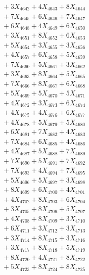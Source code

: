 \documentclass[a4paper,10pt]{article}
\begin{document}
{\begin{align}
&\;  + 3 X_{4642} + 4 X_{4643} + 8 X_{4644} \\[0.3ex]
&\;  + 7 X_{4645} + 6 X_{4646} + 7 X_{4647} \\[0.3ex]
&\;  + 6 X_{4648} + 4 X_{4649} + 6 X_{4650} \\[0.3ex]
&\;  + 3 X_{4651} + 8 X_{4652} + 6 X_{4653} \\[0.3ex]
&\;  + 5 X_{4654} + 3 X_{4655} + 3 X_{4656} \\[0.3ex]
&\;  + 4 X_{4657} + 6 X_{4658} + 5 X_{4659} \\[0.5ex]\allowbreak
&\;  + 7 X_{4660} + 5 X_{4661} + 3 X_{4662} \\[0.3ex]
&\;  + 3 X_{4663} + 8 X_{4664} + 5 X_{4665} \\[0.3ex]
&\;  + 7 X_{4666} + 8 X_{4667} + 6 X_{4668} \\[0.3ex]
&\;  + 5 X_{4669} + 5 X_{4670} + 5 X_{4671} \\[0.3ex]
&\;  + 4 X_{4672} + 3 X_{4673} + 6 X_{4674} \\[0.3ex]
&\;  + 4 X_{4675} + 4 X_{4676} + 6 X_{4677} \\[0.3ex]
&\;  + 4 X_{4678} + 5 X_{4679} + 5 X_{4680} \\[0.3ex]
&\;  + 6 X_{4681} + 7 X_{4682} + 4 X_{4683} \\[0.3ex]
&\;  + 7 X_{4684} + 6 X_{4685} + 4 X_{4686} \\[0.3ex]
&\;  + 4 X_{4687} + 5 X_{4688} + 7 X_{4689} \\[0.5ex]\allowbreak
&\;  + 7 X_{4690} + 5 X_{4691} + 7 X_{4692} \\[0.3ex]
&\;  + 7 X_{4693} + 4 X_{4694} + 7 X_{4695} \\[0.3ex]
&\;  + 5 X_{4696} + 5 X_{4697} + 3 X_{4698} \\[0.3ex]
&\;  + 8 X_{4699} + 6 X_{4700} + 4 X_{4701} \\[0.3ex]
&\;  + 4 X_{4702} + 8 X_{4703} + 6 X_{4704} \\[0.3ex]
&\;  + 3 X_{4705} + 8 X_{4706} + 5 X_{4707} \\[0.3ex]
&\;  + 4 X_{4708} + 8 X_{4709} + 3 X_{4710} \\[0.3ex]
&\;  + 6 X_{4711} + 3 X_{4712} + 3 X_{4713} \\[0.3ex]
&\;  + 3 X_{4714} + 8 X_{4715} + 3 X_{4716} \\[0.3ex]
&\;  + 3 X_{4717} + 8 X_{4718} + 5 X_{4719} \\[0.5ex]\allowbreak
&\;  + 8 X_{4720} + 4 X_{4721} + 8 X_{4722} \\[0.3ex]
&\;  + 5 X_{4723} + 8 X_{4724} + 8 X_{4725} \\[0.3ex]

\end{align}}
\end{document}
